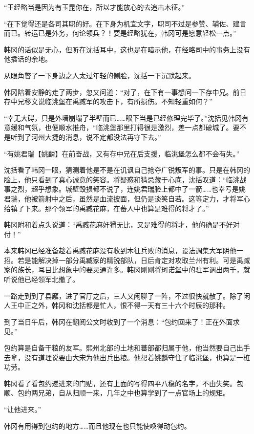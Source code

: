 “王经略当是因为有玉昆你在，所以才能放心的去追击木征。”

“在下觉得还是各司其职的好。在下身为机宜文字，职司不过是参赞、辅佐、建言而已。转运已是外务，何论领兵？！要是经略犹在，韩冈可是愿意轻松一点。”

韩冈的话似是无心，但听在沈括耳中，这也是在暗示他，在经略司中的事务上没有他插话的余地。

从眼角瞥了一下身边之人太过年轻的侧脸，沈括一下沉默起来。

韩冈陪着安静的走了两步，忽又问道：“对了，在下有一事想问一下存中兄。前日存中兄移文说临洮堡在禹臧军的攻击下，有所损伤。不知轻重如何？”

“幸无大碍，只是外墙崩塌了半壁而已……眼下当是已经修理完毕了。”沈括见韩冈有意缓和气氛，也便顺水推舟，“临洮堡那里打得很是激烈，差一点都破城了。要不是听到了河州大捷的消息，说不定都没法再守下去。”

“有姚君瑞【姚麟】在前奋战，又有存中兄在后支援，临洮堡怎么都不会有失。”

沈括看了韩冈一眼，猜测着他是不是在讥讽自己抢夺广锐叛军的事。只是在韩冈的脸上，他只看到了真心诚意的笑容。将疑惑和猜忌藏于心底，沈括叹道：“临洮战事之烈，超乎想象。城壁毁损都不说了，连姚君瑞脸上都中了一箭……也幸亏是姚君瑞，他被箭射中之后，虽然是血流披面，但仍是谈笑自若。这等定力，才将军心给镇了下来。那个领军的禹臧花麻，在蕃人中也算是难得的将才了。”

韩冈附和着点头说道：“禹臧花麻奸猾无比，又是难得的将才，他的确是不好对付！”

本来韩冈已经准备趁着禹臧花麻没有收到木征兵败的消息，设法调集大军阴他一招。若是能解决掉一部分禹臧家的精锐部队，日后肯定对攻取兰州有利。可是禹臧家的族长，耳目比想象中的要灵通许多。韩冈刚刚将珂诺堡中的驻军调出两千，就听说他已经领军北撤了。

一路走到到了县廨，进了官厅之后，三人又闲聊了一阵，不过很快就散了。除了闲人王中正之外，韩冈和沈括都是忙人，恨不得一天有三十六个时辰的那种。

到了当日午后，韩冈在翻阅公文时收到了一个消息：“包约回来了！正在外面求见。”

包约算是自备干粮的友军。熙州北部的土地和蕃部都归属于他，他当然要自己出手去拿，没有道理说要由大宋为他出兵出粮。他帮着姚麟守住了临洮堡，也算是一桩功劳。

韩冈看了看包约递进来的门贴，还有上面的写得四平八稳的名字，不由失笑。包顺、包约两兄弟，自从归顺一来，几年之中也算学到了一点官场上的规矩。

“让他进来。”

韩冈有用得到包约的地方……而且他现在也只能使唤得动包约。


